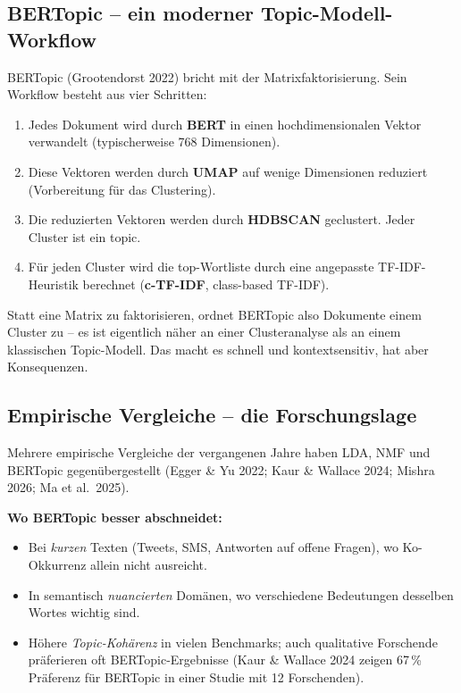 \documentclass[a4paper,11pt]{article}
\begin{document}
\subsection{BERTopic -- ein moderner Topic-Modell-Workflow}

BERTopic (Grootendorst 2022) bricht mit der Matrixfaktorisierung. Sein
Workflow besteht aus vier Schritten:

\begin{enumerate}
\item Jedes Dokument wird durch \textbf{BERT} in einen
hochdimensionalen Vektor verwandelt (typischerweise 768 Dimensionen).

\item Diese Vektoren werden durch \textbf{UMAP} auf wenige Dimensionen
reduziert (Vorbereitung für das Clustering).

\item Die reduzierten Vektoren werden durch \textbf{HDBSCAN}
geclustert. Jeder Cluster ist ein topic.

\item Für jeden Cluster wird die top-Wortliste durch eine angepasste
TF-IDF-Heuristik berechnet (\textbf{c-TF-IDF}, class-based TF-IDF).
\end{enumerate}

Statt eine Matrix zu faktorisieren, ordnet BERTopic also Dokumente
einem Cluster zu -- es ist eigentlich näher an einer Clusteranalyse
als an einem klassischen Topic-Modell. Das macht es schnell und
kontextsensitiv, hat aber Konsequenzen.

\subsection{Empirische Vergleiche -- die Forschungslage}

Mehrere empirische Vergleiche der vergangenen Jahre haben LDA, NMF
und BERTopic gegenübergestellt (Egger \& Yu 2022; Kaur \& Wallace
2024; Mishra 2026; Ma et al.\ 2025).

\textbf{Wo BERTopic besser abschneidet:}

\begin{itemize}
\item Bei \emph{kurzen} Texten (Tweets, SMS, Antworten auf offene
Fragen), wo Ko-Okkurrenz allein nicht ausreicht.
\item In semantisch \emph{nuancierten} Domänen, wo verschiedene
Bedeutungen desselben Wortes wichtig sind.
\item Höhere \emph{Topic-Kohärenz} in vielen Benchmarks; auch
qualitative Forschende präferieren oft BERTopic-Ergebnisse
(Kaur \& Wallace 2024 zeigen 67\,\% Präferenz für BERTopic in
einer Studie mit 12 Forschenden).
\end{itemize}
\end{document}

